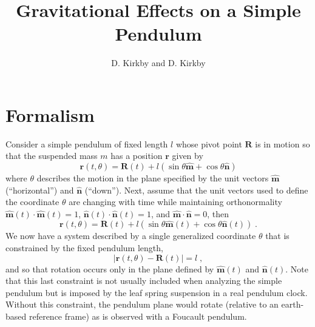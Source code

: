 \documentclass[12pt]{article}
\title{Gravitational Effects on a Simple Pendulum}
\author{D. Kirkby and D. Kirkby}
\providecommand{\vecsymbol}[1]{\ensuremath{\boldsymbol{#1}}}
\providecommand{\rv}{\vecsymbol{r}}
\providecommand{\Rv}{\vecsymbol{R}}
\providecommand{\mv}{\hat{\vecsymbol{m}}}
\providecommand{\nv}{\hat{\vecsymbol{n}}}
\begin{document}
\maketitle

\section{Formalism}

Consider a simple pendulum of fixed length $l$ whose pivot point $\Rv$ is in motion so that the suspended mass $m$ has a position $\rv$ given by
\begin{equation}
\rv(t,\theta) = \Rv(t) + l (\sin\theta \mv + \cos\theta \nv)
\end{equation}
where $\theta$ describes the motion in the plane specified by the unit vectors $\mv$ (``horizontal'') and $\nv$ (``down''). Next, assume that the unit vectors used to define the coordinate $\theta$ are changing with time while maintaining orthonormality $\mv(t)\cdot\mv(t) = 1$, $\nv(t)\cdot\nv(t) = 1$, and $\mv\cdot\nv = 0$, then
\begin{equation}
\rv(t,\theta) = \Rv(t) + l (\sin\theta \mv(t) + \cos\theta \nv(t)) \; .
\end{equation}
We now have a system described by a single generalized coordinate $\theta$ that is constrained by the fixed pendulum length,
\begin{equation}
\left| \rv(t,\theta) - \Rv(t) \right| = l \; ,
\end{equation}
and so that rotation occurs only in the plane defined by $\mv(t)$ and $\nv(t)$. Note that this last constraint is not usually included when analyzing the simple pendulum but is imposed by the leaf spring suspension in a real pendulum clock. Without this constraint, the pendulum plane would rotate (relative to an earth-based reference frame) as is observed with a Foucault pendulum.
\end{document}

